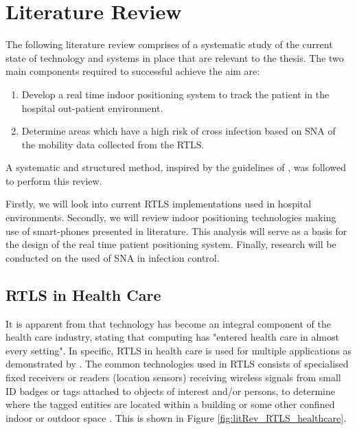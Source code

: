 \chapter{Literature Review}\label{ch:litRev}

  The following literature review comprises of a systematic study of the current state of technology and systems in place that are relevant to the thesis. The two main components required to successful achieve the aim are: 
  \begin{enumerate}
      \item Develop a real time indoor positioning system to track the patient in the hospital out-patient environment.
      \item Determine areas which have a high risk of cross infection based on SNA of the mobility data collected from the RTLS.
  \end{enumerate}  
  A systematic and structured method, inspired by the guidelines of \citeauthor{webster2002analyzing} \cite{webster2002analyzing}, was followed to perform this review.
    
    Firstly, we will look into current RTLS implementations used in hospital environments. Secondly, we will review indoor positioning technologies making use of smart-phones presented in literature. This analysis will serve as a basis for the design of the real time patient positioning system. Finally, research will be conducted on the used of SNA in infection control.
    
    	\section{RTLS in Health Care} \label{ssec:litRev_RTLShospital}
        
        
        It is apparent from \citeauthor{orwat2008towards} \cite{orwat2008towards} that technology has become an integral component of the health care industry, stating that computing has "entered health care in almost every setting". In specific, RTLS in health care is used for multiple applications as demonstrated by \citeauthor{boulos2012real} \cite{boulos2012real}. The common technologies used in RTLS consists of specialised fixed receivers or readers (location sensors) receiving wireless signals from small ID badges or tags attached to objects of interest and/or persons, to determine where the tagged entities are located within a building or some other confined indoor or outdoor space \cite{boulos2012real}. This is shown in Figure \ref{fig:litRev_RTLS_healthcare}.
        
